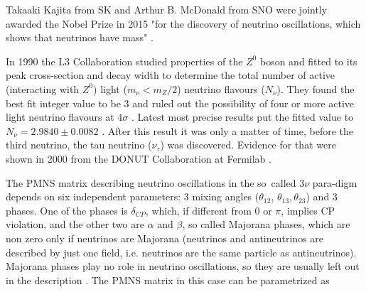 Takaaki Kajita from SK and Arthur B. McDonald from SNO were jointly awarded the Nobel Prize in 2015 "for the discovery of neutrino oscillations, which shows that neutrinos have mass" \cite{Nobel}.

In 1990 the L3 Collaboration studied properties of the $Z^0$ boson and fitted to its peak cross-section and decay width to determine the total number of active (interacting with $Z^0$) light ($m_{\nu}<m_{Z}/2$) neutrino flavours ($N_{\nu}$). They found the best fit integer value to be 3 and ruled out the possibility of four or more active light neutrino flavours at $4\sigma$ \cite{ZDecay.pdf}. Latest most precise results put the fitted value to $N_{\nu}=2.9840\pm 0.0082$ \cite{ZDecayPrecise.pdf}.
After this result it was only a matter of time, before the third neutrino, the tau neutrino ($\nu_{\tau}$) was discovered. Evidence for that were shown in 2000 from the DONUT Collaboration at Fermilab \cite{ObservationOfTauNeutrino.pdf}.

The PMNS matrix describing neutrino oscillations in the so~called $3\nu$ para-digm depends on six independent parameters: 3 mixing angles ($\theta_{12}$, $\theta_{13}, \theta_{23}$) and 3 phases. One of the phases is $\delta_{CP}$, which, if different from 0 or $\pi$, implies CP violation, and the other two are $\alpha$ and $\beta$, so called Majorana phases, which are non zero only if neutrinos are Majorana (neutrinos and antineutrinos are described by just one field, i.e. neutrinos are the same particle as antineutrinos). Majorana phases play no role in neutrino oscillations, so they are usually left out in the description \cite{PDG.pdf}. The PMNS matrix in this case can be parametrized as

